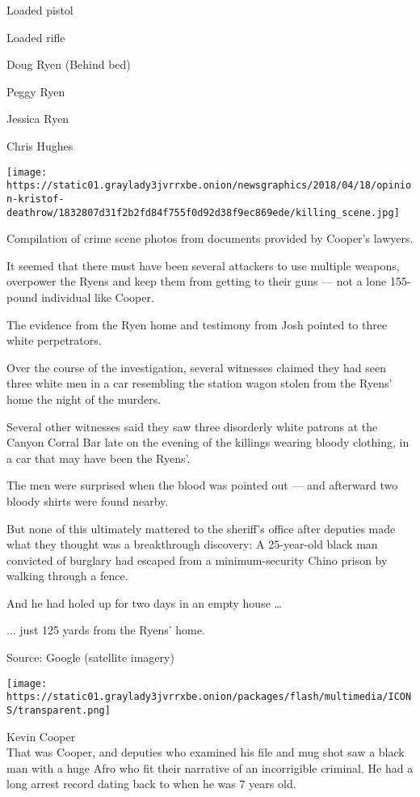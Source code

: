 Loaded pistol

Loaded rifle

Doug Ryen (Behind bed)

Peggy Ryen

Jessica Ryen

Chris Hughes

\texttt{[image: https://static01.graylady3jvrrxbe.onion/newsgraphics/2018/04/18/opinion-kristof-deathrow/1832807d31f2b2fd84f755f0d92d38f9ec869ede/killing\_scene.jpg]}

Compilation of crime scene photos from documents provided by Cooper's
lawyers.

It seemed that there must have been several attackers to use multiple
weapons, overpower the Ryens and keep them from getting to their guns
--- not a lone 155-pound individual like Cooper.

The evidence from the Ryen home and testimony from Josh pointed to three
white perpetrators.

Over the course of the investigation, several witnesses claimed they had
seen three white men in a car resembling the station wagon stolen from
the Ryens' home the night of the murders.

Several other witnesses said they saw three disorderly white patrons at
the Canyon Corral Bar late on the evening of the killings wearing bloody
clothing, in a car that may have been the Ryens'.

The men were surprised when the blood was pointed out --- and afterward
two bloody shirts were found nearby.

But none of this ultimately mattered to the sheriff's office after
deputies made what they thought was a breakthrough discovery: A
25-year-old black man convicted of burglary had escaped from a
minimum-security Chino prison by walking through a fence.

And he had holed up for two days in an empty house \ldots{}

... just 125 yards from the Ryens' home.

Source: Google (satellite imagery)

\texttt{[image: https://static01.graylady3jvrrxbe.onion/packages/flash/multimedia/ICONS/transparent.png]}

Kevin Cooper\\

That was Cooper, and deputies who examined his file and mug shot saw a
black man with a huge Afro who fit their narrative of an incorrigible
criminal. He had a long arrest record dating back to when he was 7 years
old.

